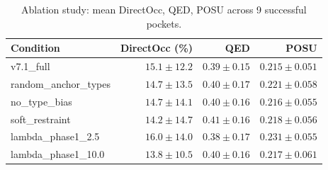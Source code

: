 \begin{table}[t]
\centering
\caption{Ablation study: mean DirectOcc, QED, POSU across 9 successful pockets.}
\label{tab:ablation}
\begin{tabular}{lrrr}
\toprule
Condition & DirectOcc (\%) & QED & POSU \\
\midrule
v7.1\_full & $15.1\pm12.2$ & $0.39\pm0.15$ & $0.215\pm0.051$ \\
random\_anchor\_types & $14.7\pm13.5$ & $0.40\pm0.17$ & $0.221\pm0.058$ \\
no\_type\_bias & $14.7\pm14.1$ & $0.40\pm0.16$ & $0.216\pm0.055$ \\
soft\_restraint & $14.2\pm14.7$ & $0.41\pm0.16$ & $0.218\pm0.056$ \\
lambda\_phase1\_2.5 & $16.0\pm14.0$ & $0.38\pm0.17$ & $0.231\pm0.055$ \\
lambda\_phase1\_10.0 & $13.8\pm10.5$ & $0.40\pm0.16$ & $0.217\pm0.061$ \\
\bottomrule
\end{tabular}
\end{table}
